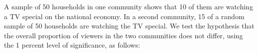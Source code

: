 \item 
 A sample of 50 households in one community
 shows that 10 of them are watching a TV special on the national
 economy. In a second community, 15 of a random sample of 50
 households are watching the TV special. We test the hypothesis
 that the overall proportion of viewers in the two communities does
 not differ, using the 1 percent level of significance, as follows:
 

